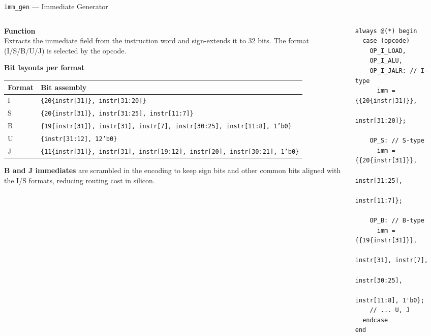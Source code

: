 \documentclass[aspectratio=169,10pt]{beamer}
\begin{document}
\begin{frame}[fragile]{\texttt{imm\_gen} --- Immediate Generator}
  \begin{columns}[T]
    \begin{column}{0.52\textwidth}
      \textbf{Function}\\
      Extracts the immediate field from the instruction word and sign-extends it to 32 bits.
      The format (I/S/B/U/J) is selected by the opcode.

      \vspace{0.5em}
      \textbf{Bit layouts per format}
      \renewcommand{\arraystretch}{1.15}
      \scriptsize
      \begin{tabular}{l p{5.4cm}}
        \toprule
        Format & Bit assembly \\
        \midrule
        I & \texttt{\{20\{instr[31]\}, instr[31:20]\}} \\
        S & \texttt{\{20\{instr[31]\}, instr[31:25], instr[11:7]\}} \\
        B & \texttt{\{19\{instr[31]\}, instr[31], instr[7], instr[30:25], instr[11:8], 1'b0\}} \\
        U & \texttt{\{instr[31:12], 12'b0\}} \\
        J & \texttt{\{11\{instr[31]\}, instr[31], instr[19:12], instr[20], instr[30:21], 1'b0\}} \\
        \bottomrule
      \end{tabular}

      \vspace{0.5em}
      \small\textbf{B and J immediates} are scrambled in the encoding to keep sign bits and other common bits aligned with the I/S formats, reducing routing cost in silicon.
    \end{column}
    \begin{column}{0.44\textwidth}
\begin{lstlisting}
always @(*) begin
  case (opcode)
    OP_I_LOAD,
    OP_I_ALU,
    OP_I_JALR: // I-type
      imm = {{20{instr[31]}},
              instr[31:20]};

    OP_S: // S-type
      imm = {{20{instr[31]}},
              instr[31:25],
              instr[11:7]};

    OP_B: // B-type
      imm = {{19{instr[31]}},
              instr[31], instr[7],
              instr[30:25],
              instr[11:8], 1'b0};
    // ... U, J
  endcase
end
\end{lstlisting}
    \end{column}
  \end{columns}
\end{frame}
\end{document}
